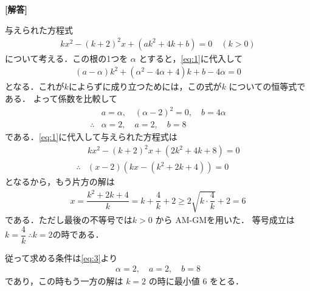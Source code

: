 \documentclass[../../main.tex]{subfiles}
\begin{document}
\begin{oframed}
  
\end{oframed}

{\bf [解答]}

与えられた方程式
\begin{align}
  kx^2-(k+2)^2x+(ak^2+4k+b)=0 \quad (k>0) \label{eq:1}
\end{align}
について考える．この根の1つを $\alpha$ とすると，\cref{eq:1}に代入して
\begin{align}
  (a-\alpha)k^2 + (\alpha^2 - 4\alpha + 4)k + b - 4\alpha = 0 \label{eq:2}
\end{align}
となる．これが$k$によらずに成り立つためには，この式が$k$ についての恒等式である．
よって係数を比較して
\begin{align}
  & a = \alpha, \quad (\alpha - 2)^2 = 0, \quad b = 4\alpha \\
  \therefore
  & \alpha = 2,\quad a = 2, \quad b = 8 \label{eq:3}
\end{align}
である．\cref{eq:1}に代入して与えられた方程式は
\begin{align}
  & k x^2 - (k+2)^2 x + (2k^2 + 4k + 8) = 0 \\
  \therefore
  & (x - 2)\left(k x - (k^2 + 2k + 4)\right) = 0
\end{align}
となるから，もう片方の解は
\begin{align}
  x = \dfrac{k^2 + 2k + 4}{k} = k + \dfrac{4}{k} + 2 \ge 2\sqrt{k\cdot \dfrac{4}{k}} + 2 = 6
\end{align}
である．ただし最後の不等号では$k > 0$ から AM-GMを用いた．
等号成立は $k = \dfrac{4}{k} \ \therefore k = 2$の時である．

従って求める条件は\cref{eq:3}より
\begin{align}
  \alpha = 2,\quad a = 2, \quad b = 8
\end{align}
であり，この時もう一方の解は $k = 2$ の時に最小値 $6$ をとる．

\newpage
\end{document}
